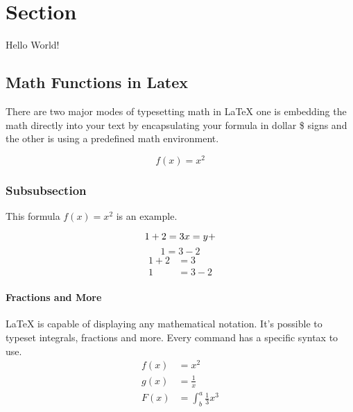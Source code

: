 \documentclass{article}
\begin{document}
\section{Section}

Hello World!

\subsection{Math Functions in Latex}
There are two major modes of typesetting math in LaTeX one is
 embedding the math directly into your text by encapsulating your 
 formula in dollar \$ signs and the other
 is using a predefined math environment.


\begin{equation*}
  f(x) = x^2
\end{equation*}

\subsubsection{Subsubsection}



This formula $f(x) = x^2$ is an example.



\begin{equation*}
    1 + 2 = 3 \\
    x = y + 
  \end{equation*}
  \begin{equation*}
    1 = 3 - 2 
  \end{equation*}
  \begin{align*}
    1 + 2 &= 3\\
    1 &= 3 - 2
  \end{align*}


\paragraph{Fractions and More}
LaTeX is capable of displaying any mathematical notation. 
It’s possible to typeset integrals, fractions and more. 
Every command has a specific syntax to use. 
\begin{align*}
    f(x) &= x^2\\
    g(x) &= \frac{1}{x}\\
    F(x) &= \int^a_b \frac{1}{3}x^3
  \end{align*}
\end{document}
